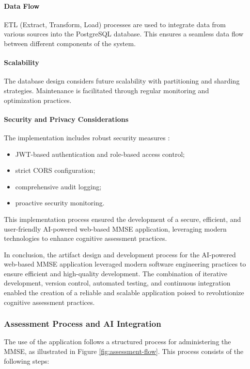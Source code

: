 \paragraph{Data Flow}
ETL (Extract, Transform, Load) processes are used to integrate data from various sources into the PostgreSQL database. This ensures a seamless data flow between different components of the system.

\paragraph{Scalability}
The database design considers future scalability with partitioning and sharding strategies. Maintenance is facilitated through regular monitoring and optimization practices.

\paragraph{Security and Privacy Considerations}
The implementation includes robust security measures \cite{owasp2021top10}:
\begin{itemize}
\item JWT-based authentication and role-based access control;
\item strict CORS configuration;
\item comprehensive audit logging;
\item proactive security monitoring.
\end{itemize}

This implementation process ensured the development of a secure, efficient, and user-friendly AI-powered web-based MMSE application, leveraging modern technologies to enhance cognitive assessment practices.

In conclusion, the artifact design and development process for the AI-powered web-based MMSE application leveraged modern software engineering practices to ensure efficient and high-quality development. The combination of iterative development, version control, automated testing, and continuous integration enabled the creation of a reliable and scalable application poised to revolutionize cognitive assessment practices.

\subsubsection{Assessment Process and AI Integration}

The use of the application follows a structured process for administering the MMSE, as illustrated in Figure \ref{fig:assessment-flow}. This process consists of the following steps:

